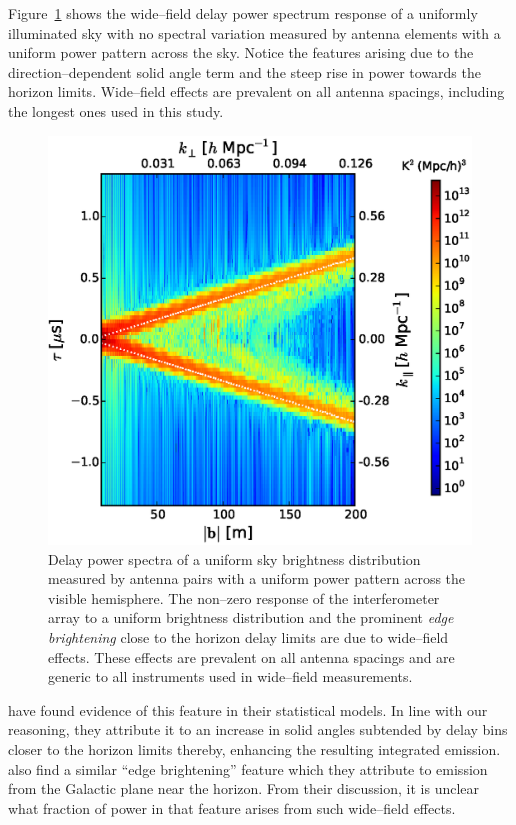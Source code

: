 \documentclass[preprint2,iop,numberedappendix]{emulateapj}
\begin{document}
Figure~\ref{fig:usm} shows the wide--field delay power spectrum response of a uniformly illuminated sky with no spectral variation measured by antenna elements with a uniform power pattern across the sky. Notice the features arising due to the direction--dependent solid angle term and the steep rise in power towards the horizon limits. Wide--field effects are prevalent on all antenna spacings, including the longest ones used in this study. 

\begin{figure}[htb]
\centering
\includegraphics[width=\linewidth]{figure3.eps}
\caption{Delay power spectra of a uniform sky brightness distribution measured by antenna pairs with a uniform power pattern across the visible hemisphere. The non--zero response of the interferometer array to a uniform brightness distribution and the prominent {\it edge brightening} close to the horizon delay limits are due to wide--field effects. These effects are prevalent on all antenna spacings and are generic to all instruments used in wide--field measurements. \label{fig:usm}}
\end{figure}

\citet{thy13} have found evidence of this feature in their statistical models. In line with our reasoning, they attribute it to an increase in solid angles subtended by delay bins closer to the horizon limits thereby, enhancing the resulting integrated emission. \citet{pob13} also find a similar ``edge brightening'' feature which they attribute to emission from the Galactic plane near the horizon. From their discussion, it is unclear what fraction of power in that feature arises from such wide--field effects.
\end{document}
